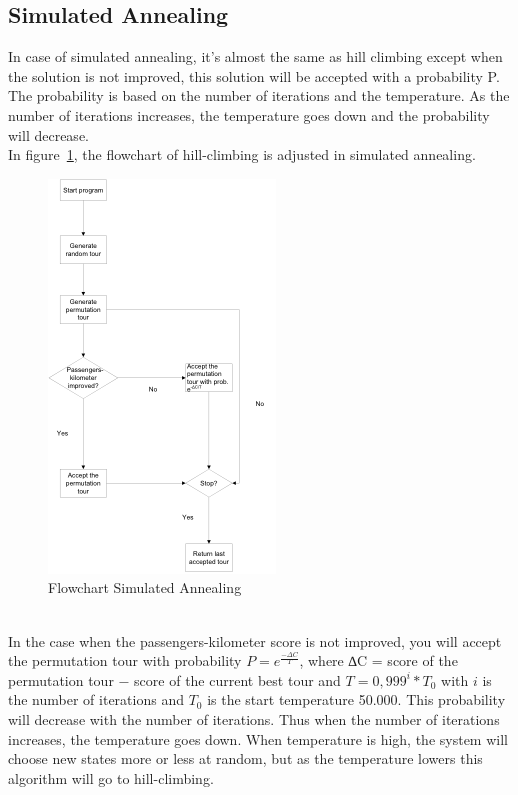 \documentclass[journal]{IEEEtran}
\begin{document}
\subsection{Simulated Annealing}
In case of simulated annealing, it’s almost the same as hill climbing except when the solution is not improved, this solution will be accepted with a probability P. The probability is based on the number of iterations and the temperature. As the number of iterations increases, the temperature goes down and the probability will decrease. \\
In figure~\ref{fig:flowchart_sa}, the flowchart of hill-climbing is adjusted in simulated annealing.\\
\begin{figure}[!h]
\centering
\includegraphics{flowchart_sa}
\caption{Flowchart Simulated Annealing}
\label{fig:flowchart_sa}
\end{figure}
\\
In the case when the passengers-kilometer score is not improved, you will accept the permutation tour with probability $P = e^{\frac{−\Delta C}{T}} $, where ∆C = score of the permutation tour − score of the current best tour and $T = 0, 999^i * T_0$ with $i$ is the number of iterations and $T_0$ is the start temperature 50.000.
 This probability will decrease with the number of iterations. Thus when the number of iterations increases, the temperature goes down. When temperature is high, the system will choose new states more or less at random, but as the temperature lowers this algorithm will go to hill-climbing. 
\end{document}
